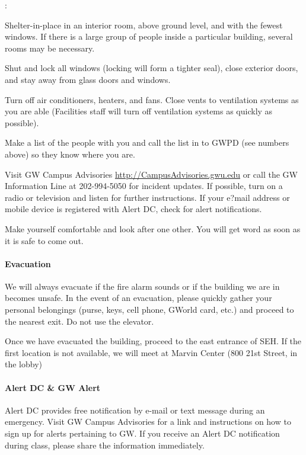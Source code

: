 \documentclass[10pt]{article}
\begin{document}
\begin{list}
{:}
{\setlength{\itemsep}{-3pt}}

\item	Shelter-in-place in an interior room, above ground level, and with the fewest windows. If there is a large group of people inside a particular building, several rooms may be necessary.
\item	Shut and lock all windows (locking will form a tighter seal), close exterior doors, and stay away from glass doors and windows.
\item	Turn off air conditioners, heaters, and fans. Close vents to ventilation systems as you are able (Facilities staff will turn off ventilation systems as quickly as possible).
\item	Make a list of the people with you and call the list in to GWPD (see numbers above) so they know where you are.
\item	Visit GW Campus Advisories \url{http://CampusAdvisories.gwu.edu} or call the GW Information Line at 202-994-5050 for incident updates. If possible, turn on a radio or television and listen for further instructions. If your e?mail address or mobile device is registered with Alert DC, check for alert notifications.
\item	Make yourself comfortable and look after one other. You will get word as soon as it is safe to come out.
\end{list}

\paragraph*{Evacuation}

We will always evacuate if the fire alarm sounds or if the building we are in becomes unsafe. In the event of an evacuation, please quickly gather your personal belongings (purse, keys, cell phone, GWorld card, etc.) and proceed to the nearest exit. Do not use the elevator.

Once we have evacuated the building, proceed to the east entrance of SEH. If the first location is not available, we will meet at Marvin Center (800 21st Street, in the lobby)


\paragraph*{Alert DC \& GW Alert}
Alert DC provides free notification by e-mail or text message during an emergency. Visit GW Campus Advisories for a link and instructions on how to sign up for alerts pertaining to GW. If you receive an Alert DC notification during class, please share the information immediately.
 
\end{document}

